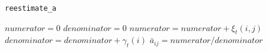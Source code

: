 \begin{algorithm}
\caption{\texttt{reestimate\_a}}
\label{koda:reestimate_a}
\begin{algorithmic}
    \State $numerator = 0$
    \State $denominator = 0$
      \State $numerator = numerator + \xi_t(i,j)$
      \State $denominator = denominator + \gamma_t(i)$
    \EndFor
    \State $\bar{a}_{ij} = numerator / denominator$
  \EndFor
\EndFor
\end{algorithmic}
\end{algorithm}
